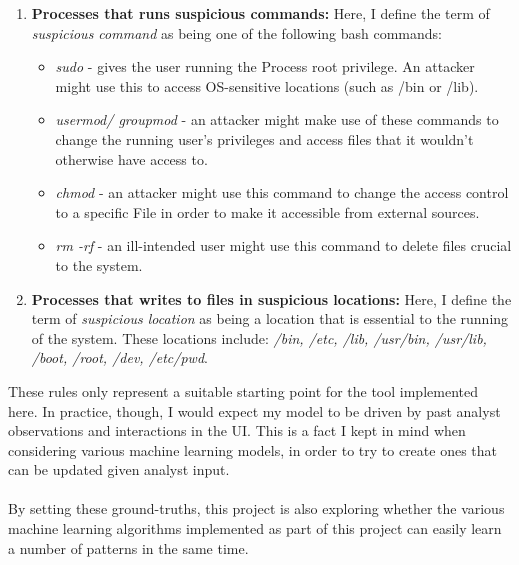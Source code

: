 \begin{enumerate}
		\item \textbf{Processes that runs suspicious commands: }Here, I define the term of \textit{suspicious command} as being one of the following bash commands:
		\begin{itemize}
			\item \textit{sudo} - gives the user running the Process root privilege. An attacker might use this to access OS-sensitive locations (such as /bin or /lib). 
			\item \textit{usermod/ groupmod} - an attacker might make use of these commands to change the running user's privileges and access files that it wouldn't otherwise have access to.
			\item \textit{chmod} - an attacker might use this command to change the access control to a specific File in order to make it accessible from external sources.
			\item \textit{rm -rf} - an ill-intended user might use this command to delete files crucial to the system. 
		\end{itemize}
	
		\item \textbf{Processes that writes to files in suspicious locations: }Here, I define the term of \textit{suspicious location} as being a location that is essential to the running of the system. These locations include:  \textit{/bin, /etc, /lib, /usr/bin, /usr/lib, /boot, /root, /dev, /etc/pwd}.
	\end{enumerate}
	These rules only represent a suitable starting point for the tool implemented here. In practice, though, I would expect my model to be driven by past analyst observations and interactions in the UI. This is a fact I kept in mind when considering various machine learning models, in order to try to create ones that can be updated given analyst input.
	\\ \\
	By setting these ground-truths, this project is also exploring whether the various machine learning algorithms implemented as part of this project can easily learn a number of patterns in the same time.
